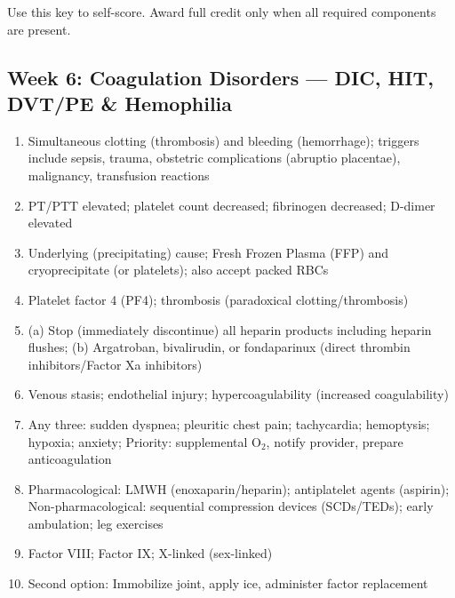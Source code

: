 \documentclass[11pt,letterpaper]{article}
\begin{document}
\begin{keybox}

Use this key to self-score.  Award full credit only when all required components are present.

\hrulefill
\subsection*{Week 6: Coagulation Disorders --- DIC, HIT, DVT/PE \& Hemophilia}
\begin{enumerate}[leftmargin=1.5em,label=\textbf{\arabic*.}]
  \item Simultaneous clotting (thrombosis) and bleeding (hemorrhage); triggers include sepsis, trauma, obstetric complications (abruptio placentae), malignancy, transfusion reactions
  \item PT/PTT elevated; platelet count decreased; fibrinogen decreased; D-dimer elevated
  \item Underlying (precipitating) cause; Fresh Frozen Plasma (FFP) and cryoprecipitate (or platelets); also accept packed RBCs
  \item Platelet factor 4 (PF4); thrombosis (paradoxical clotting/thrombosis)
  \item (a) Stop (immediately discontinue) all heparin products including heparin flushes; (b) Argatroban, bivalirudin, or fondaparinux (direct thrombin inhibitors/Factor Xa inhibitors)
  \item Venous stasis; endothelial injury; hypercoagulability (increased coagulability)
  \item Any three: sudden dyspnea; pleuritic chest pain; tachycardia; hemoptysis; hypoxia; anxiety; Priority: supplemental O$_2$, notify provider, prepare anticoagulation
  \item Pharmacological: LMWH (enoxaparin/heparin); antiplatelet agents (aspirin); Non-pharmacological: sequential compression devices (SCDs/TEDs); early ambulation; leg exercises
  \item Factor VIII; Factor IX; X-linked (sex-linked)
  \item Second option: Immobilize joint, apply ice, administer factor replacement
\end{enumerate}

\hrulefill

\end{keybox}
\end{document}
